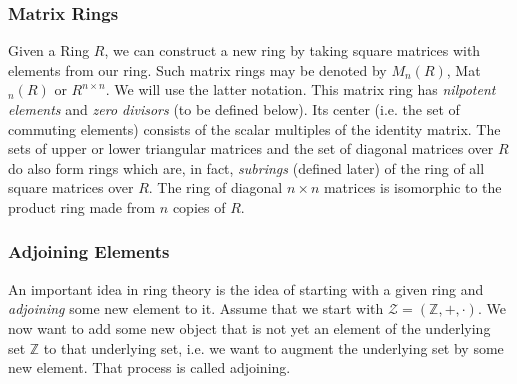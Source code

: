 

\subsubsection{Matrix Rings}
Given a Ring $R$, we can construct a new ring by taking square matrices with elements from our ring. Such matrix rings may be denoted by $M_n(R)$, Mat$_n(R)$ or $R^{n \times n}$. We will use the latter notation. This matrix ring has \emph{nilpotent elements} and \emph{zero divisors} (to be defined below). Its center (i.e. the set of commuting elements) consists of the scalar multiples of the identity matrix. The sets of upper or lower triangular matrices and the set of diagonal matrices over $R$ do also form rings which are, in fact, \emph{subrings} (defined later) of the ring of all square matrices over $R$. The ring of diagonal $n \times n$ matrices is isomorphic to the product ring made from $n$ copies of $R$.



\subsubsection{Adjoining Elements}
An important idea in ring theory is the idea of starting with a given ring and \emph{adjoining} some new element to it. Assume that we start with $\mathcal{Z} = (\mathbb{Z},+,\cdot)$. We now want to add some new object that is not yet an element of the underlying set $\mathbb{Z}$ to that underlying set, i.e. we want to augment the underlying set by some new element. That process is called adjoining. 

